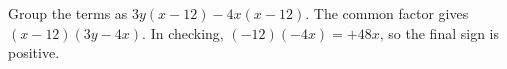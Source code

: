 Group the terms as $3y(x-12)-4x(x-12)$. The common factor gives $\boxed{(x-12)(3y-4x)}$. In checking, $(-12)(-4x)=+48x$, so the final sign is positive.
